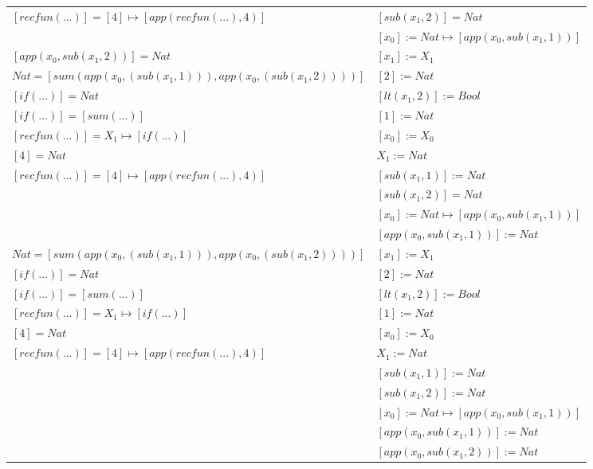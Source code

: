 \begin{exercise}
\begin{description}
\begin{center}
\begin{longtable}{ | l | l | }
                        $[recfun(...)] = [4] \mapsto [app(recfun(...), 4)]$ &  $[sub(x_1,2)] = Nat$ \\
                        & $[x_0] := Nat \mapsto [app(x_0, sub(x_1,1))]$ \\
                    \hline
                        $[app(x_0, sub(x_1,2))] = Nat$ & $[x_1] := X_1$ \\
                        $Nat = [sum(app(x_0, (sub(x_1,1))), app(x_0, (sub(x_1,2))))]$ & $[2] := Nat$ \\
                        $[if(...)] = Nat$ & $[lt(x_1 , 2)] := Bool$ \\
                        $[if(...)] = [sum(...)]$ & $[1] := Nat$ \\
                        $[recfun(...)] = X_1 \mapsto [if(...)]$ & $[x_0] := X_0$ \\
                        $[4] = Nat$ & $X_1 := Nat$ \\
                        $[recfun(...)] = [4] \mapsto [app(recfun(...), 4)]$ & $[sub(x_1,1)] := Nat$ \\
                        & $[sub(x_1,2)] = Nat$ \\
                        & $[x_0] := Nat \mapsto [app(x_0, sub(x_1,1))]$ \\
                        &  $[app(x_0, sub(x_1,1))] := Nat$\\
                    \hline
                        $Nat = [sum(app(x_0, (sub(x_1,1))), app(x_0, (sub(x_1,2))))]$ & $[x_1] := X_1$ \\
                        $[if(...)] = Nat$ & $[2] := Nat$ \\
                        $[if(...)] = [sum(...)]$ & $[lt(x_1 , 2)] := Bool$ \\
                        $[recfun(...)] = X_1 \mapsto [if(...)]$ & $[1] := Nat$ \\
                        $[4] = Nat$ & $[x_0] := X_0$ \\
                        $[recfun(...)] = [4] \mapsto [app(recfun(...), 4)]$ & $X_1 := Nat$ \\
                        & $[sub(x_1,1)] := Nat$ \\
                        & $[sub(x_1,2)] := Nat$ \\
                        & $[x_0] := Nat \mapsto [app(x_0, sub(x_1,1))]$ \\
                        & $[app(x_0, sub(x_1,1))] := Nat$ \\
                        & $[app(x_0, sub(x_1,2))] := Nat$ \\

\end{longtable}
\end{center}
\end{description}
\end{exercise}
